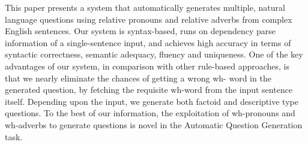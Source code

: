 This paper presents a system that automatically generates multiple, natural language questions using relative pronouns and relative adverbs from complex English sentences. Our system is syntax-based, runs on dependency parse information of a single-sentence input, and achieves high accuracy in terms of syntactic correctness, semantic adequacy, fluency and uniqueness. One of the key advantages of our system, in comparison with other rule-based approaches, is that we nearly eliminate the chances of getting a wrong wh- word in the generated question, by fetching the requisite wh-word from the input sentence itself. Depending upon the input, we generate both factoid and descriptive type questions. To the best of our information, the exploitation of wh-pronouns and wh-adverbs to generate questions is novel in the Automatic Question Generation task.
